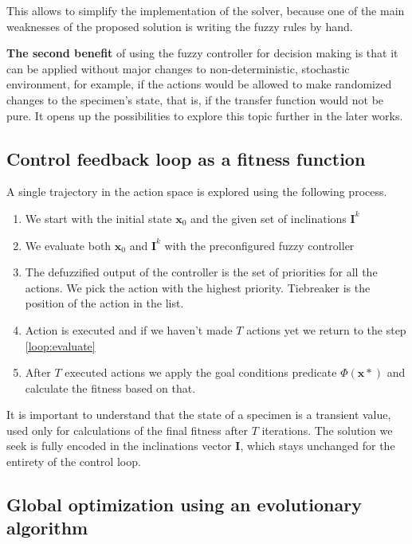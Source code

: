 \documentclass[11pt, a4paper]{article}
\begin{document}
	This allows to simplify the implementation of the solver, because one of the main weaknesses of the proposed solution is writing the fuzzy rules by hand.

  \textbf{The second benefit} of using the fuzzy controller for decision making is that it can be applied without major changes to non-deterministic, stochastic environment,
  for example, if the actions would be allowed to make randomized changes to the specimen's state, that is, if the transfer function would not be pure.
  It opens up the possibilities to explore this topic further in the later works.

	\subsection{Control feedback loop as a fitness function}\label{fitness}

	A single trajectory in the action space is explored using the following process.

	\begin{enumerate}
		\item We start with the initial state $\mathbf{x}_0$ and the given set of inclinations $\mathbf{I}^k$
		\item\label{loop:evaluate} We evaluate both $\mathbf{x}_0$ and $\mathbf{I}^k$ with the preconfigured fuzzy controller
		\item The defuzzified output of the controller is the set of priorities for all the  actions. We pick the action with the highest priority. Tiebreaker is the position of the action in the list.
		\item Action is executed and if we haven't made $T$ actions yet we return to the step \ref{loop:evaluate}
		\item After $T$ executed actions we apply the goal conditions predicate $\Phi(\mathbf{x}*)$ and calculate the fitness based on that.
	\end{enumerate}

  It is important to understand that the state of a specimen is a transient value, used only for calculations of the final fitness after $T$ iterations.
  The solution we seek is fully encoded in the inclinations vector $\mathbf{I}$, which stays unchanged for the entirety of the control loop.

	\subsection{Global optimization using an evolutionary algorithm}
\end{document}
